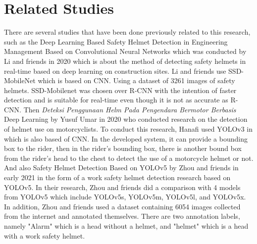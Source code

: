 \section{Related Studies}
\label{sec:relatedstudies}

There are several studies that have been 
done previously related to this research, 
such as the Deep Learning Based Safety 
Helmet Detection in Engineering Management 
Based on Convolutional Neural Networks 
which was conducted by Li and friends 
in 2020 which is about the method of 
detecting safety helmets in real-time 
based on deep learning on construction 
sites. Li and friends use SSD-MobileNet 
which is based on CNN. Using a dataset 
of 3261 images of safety helmets. 
SSD-Mobilenet was chosen over R-CNN 
with the intention of faster detection 
and is suitable for real-time even 
though it is not as accurate as 
R-CNN. \cite{li2020deep} Then \emph{Deteksi Penggunaan Helm 
Pada Pengendara Bermotor Berbasis} Deep Learning by Yusuf Umar in 2020 who 
conducted research on the detection of 
helmet use on motorcyclists. To conduct this research, Hanafi used YOLOv3 
in which is also based of CNN. 
In the developed system, it can provide 
a bounding box to the rider, then in the 
rider's bounding box, there is another 
bound box from the rider's head to the 
chest to detect the use of a motorcycle 
helmet or not. \cite{hanafi2020deteksi} 
And also Safety Helmet Detection Based on YOLOv5 by Zhou and friends in early 
2021 in the form of a work safety helmet detection research based on YOLOv5. 
In their research, Zhou and friends did a comparison with 4 models from YOLOv5 
which include YOLOv5s, YOLOv5m, YOLOv5l, and YOLOv5x. In addition, Zhou and 
friends used a dataset containing 6054 images collected from the internet 
and annotated themselves. There are two annotation labels, namely "Alarm" 
which is a head without a helmet, and "helmet" which is a head with a work 
safety helmet\cite{zhou_zhao_nie_2021}.